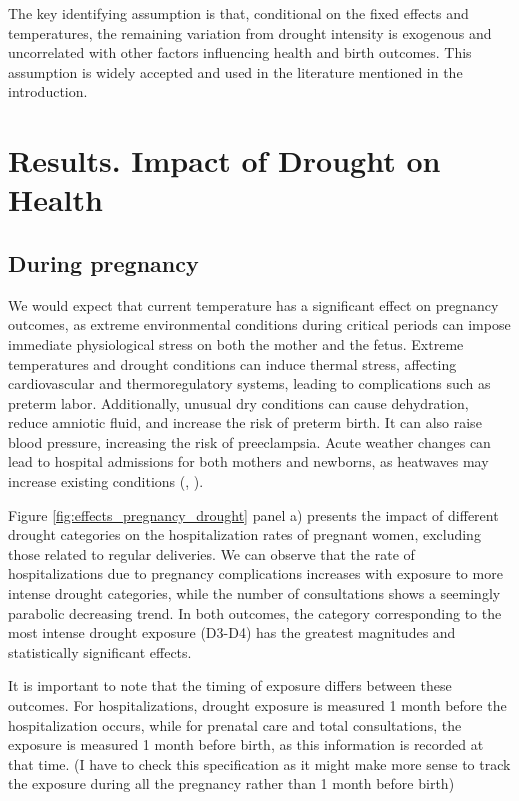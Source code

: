 \documentclass[12pt, oneside]{article}      %
\begin{document}
The key identifying assumption is that, conditional on the fixed effects and temperatures, the remaining variation from drought intensity is exogenous and uncorrelated with other factors influencing health and birth outcomes. This assumption is widely accepted and used in the literature mentioned in the introduction.


\section{Results. Impact of Drought on Health}


\subsection{During pregnancy}

We would expect that current temperature has a significant effect on pregnancy outcomes, as extreme environmental conditions during critical periods can impose immediate physiological stress on both the mother and the fetus. Extreme temperatures and drought conditions can induce thermal stress, affecting cardiovascular and thermoregulatory systems, leading to complications such as preterm labor. Additionally, unusual dry conditions can cause dehydration, reduce amniotic fluid, and increase the risk of preterm birth. It can also raise blood pressure, increasing the risk of preeclampsia. Acute weather changes can lead to hospital admissions for both mothers and newborns, as heatwaves may increase existing conditions (\cite{Ha2022}, \cite{Kim2021}).

Figure \ref{fig:effects_pregnancy_drought} panel a) presents the impact of different drought categories on the hospitalization rates of pregnant women, excluding those related to regular deliveries. We can observe that the rate of hospitalizations due to pregnancy complications increases with exposure to more intense drought categories, while the number of consultations shows a seemingly parabolic decreasing trend. In both outcomes, the category corresponding to the most intense drought exposure (D3-D4) has the greatest magnitudes and statistically significant effects.

It is important to note that the timing of exposure differs between these outcomes. For hospitalizations, drought exposure is measured 1 month before the hospitalization occurs, while for prenatal care and total consultations, the exposure is measured 1 month before birth, as this information is recorded at that time. (I have to check this specification as it might make more sense to track the exposure during all the pregnancy rather than 1 month before birth)
\end{document}
